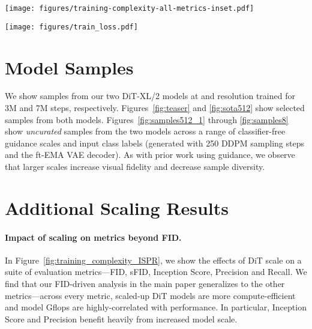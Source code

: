 \documentclass[10pt,twocolumn,letterpaper]{article}
\begin{document}
\begin{figure*}\centering
\texttt{[image: figures/training-complexity-all-metrics-inset.pdf]}
\vspace{-4mm}
\caption{\textbf{DiT scaling behavior on several generative modeling metrics.} \emph{Left:} We plot model performance as a function of total training compute for FID, sFID, Inception Score, Precision and Recall. \emph{Right:} We plot model performance at 400K training steps for all 12 DiT variants against transformer Gflops, finding strong correlations across metrics. All values were computed using the ft-MSE VAE decoder.}
\label{fig:training_complexity_ISPR}
\end{figure*}

\begin{figure*}\centering
\texttt{[image: figures/train\_loss.pdf]}
\vspace{-4mm}
\caption{\textbf{Training loss curves for all DiT models.} We plot the loss over training for all DiT models (the sum of the noise prediction mean-squared error and ). We also highlight early training behavior. Note that scaled-up DiT models exhibit lower training losses.}
\label{fig:losses}
\end{figure*}

\section{Model Samples}

We show samples from our two DiT-XL/2 models at  and  resolution trained for 3M and 7M steps, respectively. Figures~\ref{fig:teaser} and \ref{fig:sota512} show selected samples from both models. Figures~\ref{fig:samples512_1} through \ref{fig:samples8} show \textit{uncurated} samples from the two models across a range of classifier-free guidance scales and input class labels (generated with 250 DDPM sampling steps and the ft-EMA VAE decoder). As with prior work using guidance, we observe that larger scales increase visual fidelity and decrease sample diversity.

\section{Additional Scaling Results}

\paragraph{Impact of scaling on metrics beyond FID.} In Figure~\ref{fig:training_complexity_ISPR}, we show the effects of DiT scale on a suite of evaluation metrics---FID, sFID, Inception Score, Precision and Recall. We find that our FID-driven analysis in the main paper generalizes to the other metrics---across every metric, scaled-up DiT models are more compute-efficient and model Gflops are highly-correlated with performance. In particular, Inception Score and Precision benefit heavily from increased model scale.
\end{document}
